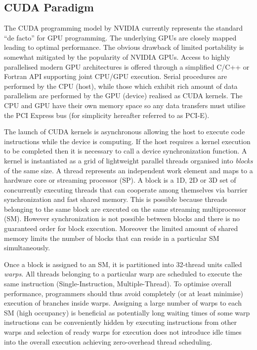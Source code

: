 \documentclass[preprint,5pt]{elsarticle}
\begin{document}
\subsection{CUDA Paradigm} 
\label{sec:cuda}

The CUDA programming model \cite{cudaurl} by NVIDIA currently represents the standard ``de facto'' for GPU programming. The underlying GPUs are closely mapped leading to optimal performance. The obvious drawback of limited portability is somewhat mitigated by the popularity of NVIDIA GPUs. Access to highly parallelised modern GPU architectures is offered through a simplified C/C++ or Fortran API supporting joint CPU/GPU execution. Serial procedures are performed by the CPU (host), while those which exhibit rich amount of data parallelism are performed by the GPU (device) realised as CUDA kernels. The CPU and GPU have their own memory space so any data transfers must utilise the PCI Express bus (for simplicity hereafter referred to as PCI-E).

The launch of CUDA kernels is asynchronous allowing the host to execute code instructions while the device is computing. If the host requires a kernel execution to be completed then it is necessary to call a device synchronization function. A kernel is instantiated as a grid of lightweight parallel threads organised into {\em blocks} of the same size. A thread represents an independent work element and maps to a hardware core or streaming processor (SP). A block is a 1D, 2D or 3D set of concurrently executing threads that can cooperate among themselves via barrier synchronization and fast shared memory. This is possible because threads belonging to the same block are executed on the same streaming multiprocessor (SM). However synchronization is not possible between blocks and there is no guaranteed order for block execution. Moreover the limited amount of shared memory limits the number of  blocks that can reside in a particular SM simultaneously.  

Once a block is assigned to an SM, it is partitioned into 32-thread units called {\em warps}. All threads belonging to a particular warp are scheduled to execute the same instruction (Single-Instruction, Multiple-Thread). To optimise overall performance, programmers should thus avoid completely (or at least minimise) execution of branches inside warps. Assigning a large number of warps to each SM (high occupancy) is beneficial as potentially long waiting times of some warp instructions can be conveniently hidden by executing instructions from other warps and selection of ready warps for execution does not introduce idle times into the overall execution achieving zero-overhead thread scheduling. 
\end{document}
